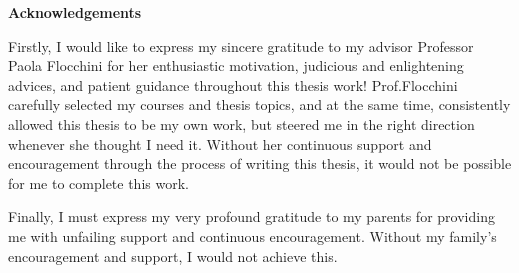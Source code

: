 
\begin{center}\textbf{Acknowledgements}\end{center}
Firstly, I would like to express my sincere gratitude to my advisor Professor Paola Flocchini for her enthusiastic motivation, judicious and enlightening advices, and patient guidance throughout this thesis work!
Prof.Flocchini carefully selected my courses and thesis topics, and at the same time, consistently allowed this thesis to be my own work, but steered me in the right direction whenever she thought I need it. Without her continuous support and encouragement through the process of writing this thesis, it would not be possible for me to complete this work.

Finally, I must express my very profound gratitude to my parents for providing me with unfailing support and continuous encouragement. Without my family's encouragement and support, I would not achieve this. 




\cleardoublepage
